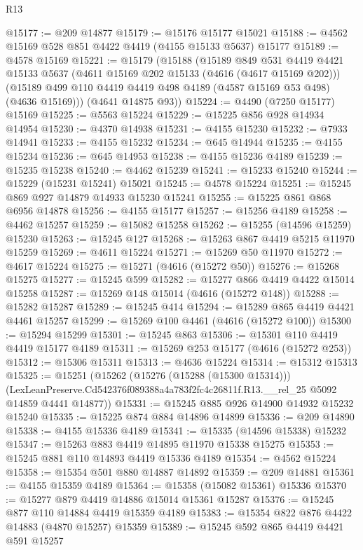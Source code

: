 \begin{lexlean}{R13}
\begin{coremodule}
@15177 := @209 @14877
@15179 := @15176 @15177 @15021
@15188 := @4562 @15169 @528 @851 @4422 @4419 (@4155 @15133 @5637) @15177
@15189 := @4578 @15169
@15221 := @15179
    (@15188
      (@15189
        @849
        @531
        @4419
        @4421
        @15133
        @5637
        (@4611 @15169 @202 @15133 (@4616 (@4617 @15169 @202)))
        (@15189 @499 @110 @4419 @4419 @498 @4189 (@4587 @15169 @53 @498) (@4636 @15169)))
      (@4641 @14875 @93))
@15224 := @4490 (@7250 @15177) @15169
@15225 := @5563 @15224
@15229 := @15225 @856 @928 @14934 @14954
@15230 := @4370 @14938
@15231 := @4155 @15230
@15232 := @7933 @14941
@15233 := @4155 @15232
@15234 := @645 @14944
@15235 := @4155 @15234
@15236 := @645 @14953
@15238 := @4155 @15236 @4189
@15239 := @15235 @15238
@15240 := @4462 @15239
@15241 := @15233 @15240
@15244 := @15229 (@15231 @15241) @15021
@15245 := @4578 @15224
@15251 := @15245 @869 @927 @14879 @14933 @15230 @15241
@15255 := @15225 @861 @868 @6956 @14878
@15256 := @4155 @15177
@15257 := @15256 @4189
@15258 := @4462 @15257
@15259 := @15082 @15258
@15262 := @15255 (@14596 @15259) @15230
@15263 := @15245 @127
@15268 := @15263 @867 @4419 @5215 @11970 @15259
@15269 := @4611 @15224
@15271 := @15269 @50 @11970
@15272 := @4617 @15224
@15275 := @15271 (@4616 (@15272 @50))
@15276 := @15268 @15275
@15277 := @15245 @599
@15282 := @15277 @866 @4419 @4422 @15014 @15258
@15287 := @15269 @148 @15014 (@4616 (@15272 @148))
@15288 := @15282 @15287
@15289 := @15245 @414
@15294 := @15289 @865 @4419 @4421 @4461 @15257
@15299 := @15269 @100 @4461 (@4616 (@15272 @100))
@15300 := @15294 @15299
@15301 := @15245 @863
@15306 := @15301 @110 @4419 @4419 @15177 @4189
@15311 := @15269 @253 @15177 (@4616 (@15272 @253))
@15312 := @15306 @15311
@15313 := @4636 @15224
@15314 := @15312 @15313
@15325 := @15251
    (@15262
      (@15276 (@15288 (@15300 @15314)))
      (LexLeanPreserve.Cd542376f089388a4a783f2fc4c26811f.R13.__rel_25 @5092 @14859 @4441 @14877))
@15331 := @15245 @885 @926 @14900 @14932 @15232 @15240
@15335 := @15225 @874 @884 @14896 @14899
@15336 := @209 @14890
@15338 := @4155 @15336 @4189
@15341 := @15335 (@14596 @15338) @15232
@15347 := @15263 @883 @4419 @14895 @11970 @15338 @15275
@15353 := @15245 @881 @110 @14893 @4419 @15336 @4189
@15354 := @4562 @15224
@15358 := @15354 @501 @880 @14887 @14892
@15359 := @209 @14881
@15361 := @4155 @15359 @4189
@15364 := @15358 (@15082 @15361) @15336
@15370 := @15277 @879 @4419 @14886 @15014 @15361 @15287
@15376 := @15245 @877 @110 @14884 @4419 @15359 @4189
@15383 := @15354 @822 @876 @4422 @14883 (@4870 @15257) @15359
@15389 := @15245 @592 @865 @4419 @4421 @591 @15257

\end{coremodule}
\end{lexlean}
